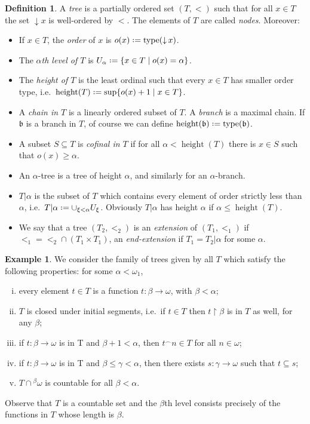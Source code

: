 \documentclass[11pt,a4paper]{report}
\theoremstyle{definition}
\newtheorem{defn}[theorem]{Definition}
\newtheorem{example}[theorem]{Example}
\theoremstyle{num.custom-title}
\theoremstyle{custom-title}
\DeclareMathOperator{\sse}{\subseteq}
\DeclareMathOperator{\type}{type}
\DeclareMathOperator{\height}{height}
\DeclareMathOperator{\restr}{\upharpoonright}
\DeclareMathOperator{\down}{\downarrow}
\newcommand{\conc}{^\frown}
\newcommand*{\defeq}{\mathrel{\rlap{%
                     \raisebox{0.3ex}{$\cdot$}}%
                     \raisebox{-0.3ex}{$\cdot$}}%
                     =}
\begin{document}
\begin{defn}
A \emph{tree} is a partially ordered set $(T,<)$ such that for all $x \in T$ the set $\down x$ is well-ordered by $<$. The elements of $T$ are called \emph{nodes}. Moreover:
\begin{itemize}
\item If $x \in T$, the \emph{order} of $x$ is $o(x) \defeq \type(\down x)$.
\item The \emph{$\alpha$th level of $T$} is $U_\alpha \defeq \{x \in T \mid o(x)=\alpha\}$.
\item The \emph{height of $T$} is the least ordinal such that every $x \in T$ has smaller order type, i.e.\ $\height(T) \defeq \sup\{o(x)+1 \mid x \in T\}$.
\item A \emph{chain in $T$} is a linearly ordered subset of $T$. A \emph{branch} is a maximal chain. If $\mathfrak{b}$ is a branch in $T$, of course we can define $\height(\mathfrak{b}) \defeq \type(\mathfrak{b})$.
\item A subset $S \sse T$ is \emph{cofinal in $T$} if for all $\alpha < \height(T)$ there is $x \in S$ such that $o(x) \geq \alpha$.
\item An $\alpha$-tree is a tree of height $\alpha$, and similarly for an $\alpha$-branch.
\item $T|\alpha$ is the subset of $T$ which contains every element of order strictly less than $\alpha$, i.e.\ $T|\alpha \defeq \cup_{\xi < \alpha} U_\xi$. Obviously $T|\alpha$ has height $\alpha$ if $\alpha \leq \height(T)$.
\item We say that a tree $(T_2,<_2)$ is an \emph{extension} of $(T_1,<_1)$ if ${<_1} = {<_2} \cap (T_1 \times T_1)$, an \emph{end-extension} if $T_1=T_2|\alpha$ for some $\alpha$.
\end{itemize}
\end{defn}

\begin{example}\label{example-countable_normal_trees}
We consider the family of trees given by all $T$ which satisfy the following properties: for some $\alpha < \omega_1$,
\begin{enumerate}[(i)]
\item every element $t \in T$ is a function $t \colon \beta \to \omega$, with $\beta < \alpha$;
\item $T$ is closed under initial segments, i.e.\ if $t \in T$ then $t \restr \beta$ is in $T$ as well, for any $\beta$;
\item if $t \colon \beta \to \omega$ is in T and $\beta+1 < \alpha$, then $t \conc n \in T$ for all $n \in \omega$;
\item if $t \colon \beta \to \omega$ is in T and $\beta \leq \gamma < \alpha$, then there exists $s \colon \gamma \to \omega$ such that $t \sse s$;
\item $T \cap {}^{\beta} \omega$ is countable for all $\beta < \alpha$.
\end{enumerate}
Observe that $T$ is a countable set and the $\beta$th level consists precisely of the functions in $T$ whose length is $\beta$.
\end{example}
\end{document}
